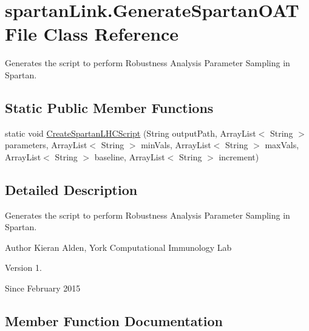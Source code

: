 \hypertarget{classspartanLink_1_1GenerateSpartanOATFile}{}\section{spartan\+Link.\+Generate\+Spartan\+O\+A\+T\+File Class Reference}
\label{classspartanLink_1_1GenerateSpartanOATFile}


Generates the script to perform Robustness Analysis Parameter Sampling in Spartan.  


\subsection*{Static Public Member Functions}
\begin{DoxyCompactItemize}
\item 
static void \hyperlink{classspartanLink_1_1GenerateSpartanOATFile_a86dab58f5a096d2ed0085adf958ea158}{Create\+Spartan\+L\+H\+C\+Script} (String output\+Path, Array\+List$<$ String $>$ parameters, Array\+List$<$ String $>$ min\+Vals, Array\+List$<$ String $>$ max\+Vals, Array\+List$<$ String $>$ baseline, Array\+List$<$ String $>$ increment)
\end{DoxyCompactItemize}


\subsection{Detailed Description}
Generates the script to perform Robustness Analysis Parameter Sampling in Spartan. 

\begin{DoxyAuthor}{Author}
Kieran Alden, York Computational Immunology Lab 
\end{DoxyAuthor}
\begin{DoxyVersion}{Version}
1. 
\end{DoxyVersion}
\begin{DoxySince}{Since}
February 2015 
\end{DoxySince}


\subsection{Member Function Documentation}
\hypertarget{classspartanLink_1_1GenerateSpartanOATFile_a86dab58f5a096d2ed0085adf958ea158}{}
